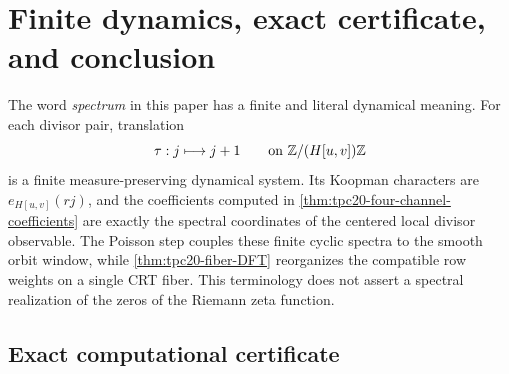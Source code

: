 \section{Finite dynamics, exact certificate, and conclusion}
\label{sec:tpc20-certificate-conclusion}

The word \emph{spectrum} in this paper has a finite and literal
dynamical meaning.  For each divisor pair, translation
\begin{equation}
 \tau:j\longmapsto j+1
 \qquad\text{on }\mathbb Z/(H[u,v])\mathbb Z
 \label{eq:tpc20-cyclic-shift}
\end{equation}
is a finite measure-preserving dynamical system.  Its Koopman
characters are \(e_{H[u,v]}(rj)\), and the coefficients computed in
\cref{thm:tpc20-four-channel-coefficients} are exactly the spectral coordinates
of the centered local divisor observable.  The Poisson step couples
these finite cyclic spectra to the smooth orbit window, while
\cref{thm:tpc20-fiber-DFT} reorganizes the compatible row weights on a
single CRT fiber.  This terminology does not assert a spectral
realization of the zeros of the Riemann zeta function.

\subsection{Exact computational certificate}

